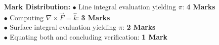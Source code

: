 \begin{solutionbox}
\begin{markingrubric}
\textbf{Mark Distribution:}
$\bullet$ Line integral evaluation yielding $\pi$: \textbf{4 Marks}\\
$\bullet$ Computing $\nabla \times \vec{F} = \hat{k}$: \textbf{3 Marks}\\
$\bullet$ Surface integral evaluation yielding $\pi$: \textbf{2 Marks}\\
$\bullet$ Equating both and concluding verification: \textbf{1 Mark}
\end{markingrubric}
\end{solutionbox}

\newpage
